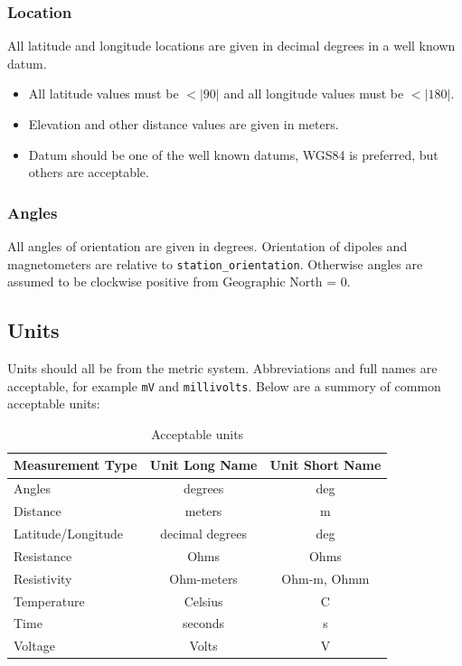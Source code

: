 \documentclass{article}
\begin{document}
\subsubsection{Location}

All latitude and longitude locations are given in decimal degrees in a well known datum.

\begin{itemize}
	\setlength\itemsep{0em}
	\item All latitude values must be $<|90|$ and all longitude values must be $<|180|$.
	\item Elevation and other distance values are given in meters.
	\item Datum should be one of the well known datums, WGS84 is preferred, but others are acceptable.
\end{itemize} 

\subsubsection{Angles}

All angles of orientation are given in degrees.  Orientation of dipoles and magnetometers are relative to \verb|station_orientation|.  Otherwise angles are assumed to be clockwise positive from Geographic North = 0.  

\subsection{Units}
Units should all be from the metric system.  Abbreviations and full names are acceptable, for example \verb|mV| and \verb|millivolts|.  Below are a summory of common acceptable units:


\begin{table}[htb!]
	\centering
	\caption[Acceptable units]{Acceptable units}
	\begin{tabular}{|l|c|c|}
		\hline
		\textbf{Measurement Type} & \textbf{Unit Long Name}  & \textbf{Unit Short Name} \\ \hline
		Angles & degrees & deg \\ \hline
		
		Distance &  meters & m \\ \hline
		Latitude/Longitude & decimal degrees & deg \\ \hline
		Resistance & Ohms  &  Ohms \\ \hline
		Resistivity & Ohm-meters & Ohm-m, Ohmm \\ \hline
		Temperature & Celsius & C \\ \hline
		Time &  seconds & s \\ \hline
		Voltage & Volts & V \\ \hline
		
		
	\end{tabular}
	\label{tab:units}
\end{table}
\end{document}
